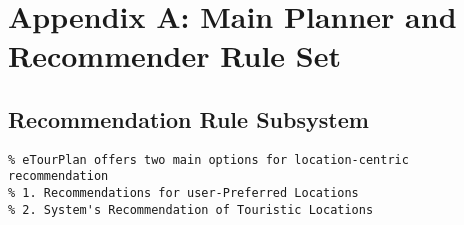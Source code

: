
\chapter*{Appendix A: Main Planner and Recommender Rule Set}
\section*{Recommendation Rule Subsystem}

\singlespacing
\begin{verbatim}
% eTourPlan offers two main options for location-centric recommendation
% 1. Recommendations for user-Preferred Locations
% 2. System's Recommendation of Touristic Locations
\end{verbatim}
\vspace{-0.2in}
\footnotesize
